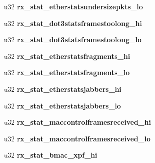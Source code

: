 \begin{DoxyCompactItemize}
\item 
\hypertarget{structbnx2x__eth__stats_afed273ba70d166f10f9435b6b464321d}{
u32 {\bfseries rx\_\-stat\_\-etherstatsundersizepkts\_\-lo}}
\label{structbnx2x__eth__stats_afed273ba70d166f10f9435b6b464321d}

\item 
\hypertarget{structbnx2x__eth__stats_aea529bbab493be65e8dda52c59bfa7f0}{
u32 {\bfseries rx\_\-stat\_\-dot3statsframestoolong\_\-hi}}
\label{structbnx2x__eth__stats_aea529bbab493be65e8dda52c59bfa7f0}

\item 
\hypertarget{structbnx2x__eth__stats_a025c2c59fdd5b7feb4acebf86cc0afff}{
u32 {\bfseries rx\_\-stat\_\-dot3statsframestoolong\_\-lo}}
\label{structbnx2x__eth__stats_a025c2c59fdd5b7feb4acebf86cc0afff}

\item 
\hypertarget{structbnx2x__eth__stats_ad0937d17ba9ac2613c56cd8bc136dd84}{
u32 {\bfseries rx\_\-stat\_\-etherstatsfragments\_\-hi}}
\label{structbnx2x__eth__stats_ad0937d17ba9ac2613c56cd8bc136dd84}

\item 
\hypertarget{structbnx2x__eth__stats_ae143b6892490f73c26ac58c687e30b7c}{
u32 {\bfseries rx\_\-stat\_\-etherstatsfragments\_\-lo}}
\label{structbnx2x__eth__stats_ae143b6892490f73c26ac58c687e30b7c}

\item 
\hypertarget{structbnx2x__eth__stats_a0ae792bbad823bc1d0ccee0563bd0b5b}{
u32 {\bfseries rx\_\-stat\_\-etherstatsjabbers\_\-hi}}
\label{structbnx2x__eth__stats_a0ae792bbad823bc1d0ccee0563bd0b5b}

\item 
\hypertarget{structbnx2x__eth__stats_a052bebb925fc73035b64c085150efa19}{
u32 {\bfseries rx\_\-stat\_\-etherstatsjabbers\_\-lo}}
\label{structbnx2x__eth__stats_a052bebb925fc73035b64c085150efa19}

\item 
\hypertarget{structbnx2x__eth__stats_a351470d32218d20dca0418c5d027dbfe}{
u32 {\bfseries rx\_\-stat\_\-maccontrolframesreceived\_\-hi}}
\label{structbnx2x__eth__stats_a351470d32218d20dca0418c5d027dbfe}

\item 
\hypertarget{structbnx2x__eth__stats_a327338f208d095432d122a457b28af95}{
u32 {\bfseries rx\_\-stat\_\-maccontrolframesreceived\_\-lo}}
\label{structbnx2x__eth__stats_a327338f208d095432d122a457b28af95}

\item 
\hypertarget{structbnx2x__eth__stats_a5dd4f1d4f4e59e2013d43e17e210cba1}{
u32 {\bfseries rx\_\-stat\_\-bmac\_\-xpf\_\-hi}}
\label{structbnx2x__eth__stats_a5dd4f1d4f4e59e2013d43e17e210cba1}


\end{DoxyCompactItemize}
